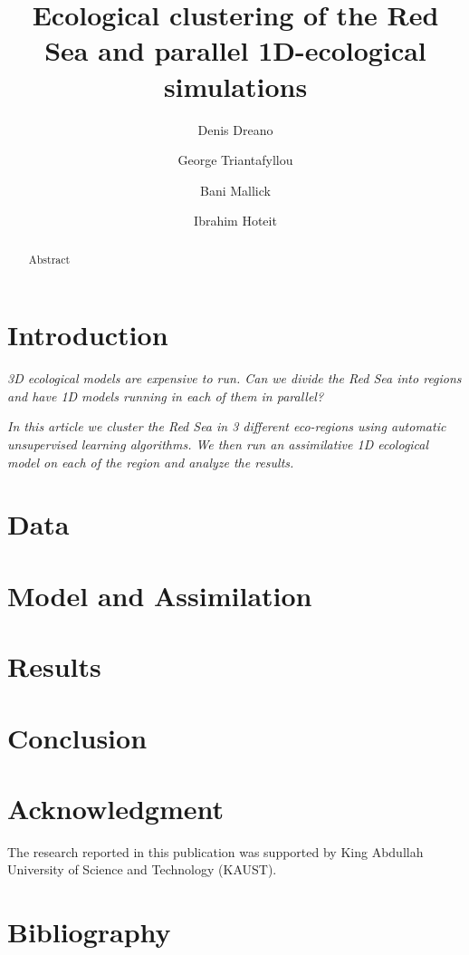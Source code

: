 \documentclass[12pt]{elsarticle}
\begin{document}
\doublespacing

\begin{frontmatter}

  \title{Ecological clustering of the Red Sea and parallel 1D-ecological simulations}

  \author[1]{Denis Dreano}

  \author[3]{George Triantafyllou}

  \author[2]{Bani Mallick}
  
  \author[1]{Ibrahim Hoteit}
   


  \address[1]{Computer, Electrical and Mathematical Sciences and Engineering Division, King Abdullah University of Science and Technology}

  \address[2]{Department of Statistics, Texas A\&M University}

  \address[3]{Hellenic Center for Marine Research}

  \begin{abstract}
  Abstract
  \end{abstract}

\end{frontmatter}

\linenumbers


\section{Introduction}

\emph{3D ecological models are expensive to run. Can we divide the Red Sea
into regions and have 1D models running in each of them in parallel?}

\emph{In this article we cluster the Red Sea in 3 different eco-regions
using automatic unsupervised learning algorithms. We then run an 
assimilative 1D ecological model on each of the region and analyze 
the results.}

\section{Data}

\section{Model and Assimilation}

\section{Results}

\section{Conclusion}



\section*{Acknowledgment}

The research reported in this publication was supported by King Abdullah University of Science and Technology (KAUST).

\section{Bibliography}

 
\end{document}
